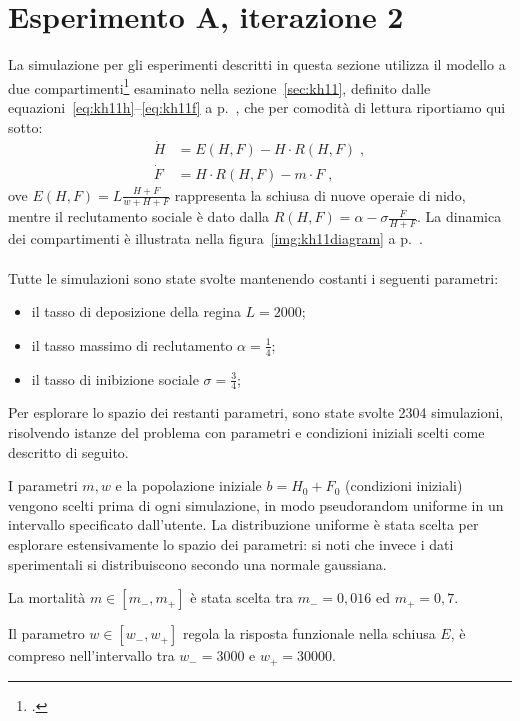 \section{Esperimento A, iterazione 2}
La simulazione per gli esperimenti descritti in questa sezione utilizza il modello a due compartimenti\footcite{khoury2011}
esaminato nella sezione~\ref{sec:kh11},
definito dalle equazioni~\eqref{eq:kh11h}--\eqref{eq:kh11f} a p.~\pageref{eq:kh11h}, che per comodità
di lettura riportiamo qui sotto:
\begin{align*}
    \dot{H} &= E(H,F)- H \cdot R(H,F)\; , \\
    \dot{F} &= H \cdot R(H,F)  - m \cdot F\; ,
\end{align*}
ove $E(H,F) = L \frac{H+F}{w + H + F}$ rappresenta la schiusa di nuove operaie di nido,
mentre il reclutamento sociale è dato dalla $R(H,F) = \alpha - \sigma \frac{F}{H+F}$.
La dinamica dei compartimenti è illustrata nella figura~\ref{img:kh11diagram} a p.~\pageref{img:kh11diagram}.

\paragraph{}
Tutte le simulazioni sono state svolte mantenendo costanti i seguenti parametri:
\begin{itemize}
    \item il tasso di deposizione della regina $L=2000$;
    \item il tasso massimo di reclutamento $\alpha = \frac{1}{4}$;
    \item il tasso di inibizione sociale $\sigma = \frac{3}{4}$;
\end{itemize}

Per esplorare lo spazio dei restanti parametri, sono state svolte 2304 simulazioni, risolvendo istanze del problema
con parametri e condizioni iniziali scelti come descritto di seguito.

I parametri $m,w$ e la popolazione iniziale $b=H_0 + F_0$ (condizioni iniziali) vengono scelti prima di ogni simulazione,
in modo pseudorandom uniforme in un intervallo specificato dall'utente. La distribuzione uniforme è stata scelta per esplorare estensivamente
lo spazio dei parametri: si noti che invece i dati sperimentali si distribuiscono secondo una normale gaussiana.

La mortalità $m \in \left[ m_-, m_+ \right]$ è stata scelta tra $m_-=0,016$ ed $m_+ =0,7$.

Il parametro $w \in \left[ w_-, w_+ \right]$ regola la risposta funzionale nella schiusa $E$, è
compreso nell'intervallo tra $w_- = 3000$ e $w_+ = 30000$.

